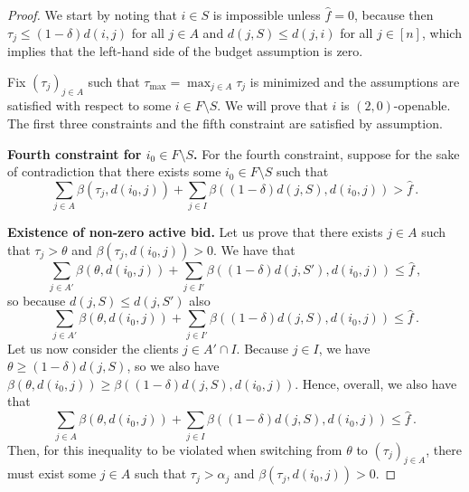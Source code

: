 \begin{proof}
We start by noting that $i \in S$ is impossible unless $\hat f=0$, because then $\tau_j \leq  (1-\delta) d(i,j)$ for all $j \in A$ and $d(j, S) \leq d(j, i)$ for all $j \in [n]$, which implies that the left-hand side of the budget assumption is zero.

Fix $(\tau_j)_{j \in A}$ such that $\tau_{\max} = \max_{j \in A} \tau_j$ is minimized and the assumptions are satisfied with respect to some $i \in F \setminus S$.
We will prove that $i$ is $(2,0)$-openable.
The first three constraints and the fifth constraint are satisfied by assumption.

\textbf{Fourth constraint for $i_0 \in F \setminus S$.}
For the fourth constraint, suppose for the sake of contradiction that there exists some $i_0 \in F \setminus S$ such that
\[\sum_{j \in A} \beta(\tau_j, d(i_0, j)) + \sum_{j \in I}\beta((1-\delta)d(j,S), d(i_0, j)) > \hat{f}\,.\]

\textbf{Existence of non-zero active bid.}
Let us prove that there exists $j \in A$ such that $\tau_j > \theta$ and $\beta(\tau_{j}, d(i_0, {j})) > 0$.
We have that
\[\sum_{j \in A'} \beta(\theta, d(i_0, j)) + \sum_{j \in I'}\beta((1-\delta)d(j,S'), d(i_0, j)) \leq \hat{f}\,,\]
so because $d(j, S) \leq d(j, S')$ also 
\[\sum_{j \in A'} \beta(\theta, d(i_0, j)) + \sum_{j \in I'}\beta((1-\delta)d(j,S), d(i_0, j)) \leq \hat{f}\,.\]
Let us now consider the clients $j \in A' \cap I$.
Because $j \in I$, we have $\theta \geq (1-\delta) d(j,S)$, so we also have $\beta(\theta, d(i_0, j)) \geq \beta((1-\delta)d(j,S), d(i_0, j))$.
Hence, overall, we also have that 
\[\sum_{j \in A} \beta(\theta, d(i_0, j)) + \sum_{j \in I}\beta((1-\delta)d(j,S), d(i_0, j)) \leq \hat{f}\,.\]
Then, for this inequality to be violated when switching from $\theta$ to $(\tau_j)_{j \in A}$, there must exist some $j \in A$ such that $\tau_{j} > \alpha_{j}$ and $\beta(\tau_{j}, d(i_0, {j})) > 0$.


\end{proof}
